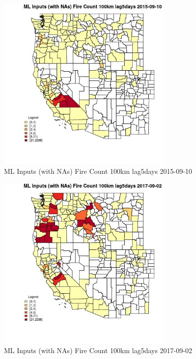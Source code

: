 \begin{figure} 
\centering  
\includegraphics[width=0.77\textwidth]{Code_Outputs/Report_ML_input_PM25_Step4_part_e_de_duplicated_aves_compiled_2019-05-21wNAs_CountyFire_Count_100km_lag5daysMean2015-09-10.jpg} 
\caption{\label{fig:Report_ML_input_PM25_Step4_part_e_de_duplicated_aves_compiled_2019-05-21wNAsCountyFire_Count_100km_lag5daysMean2015-09-10}ML Inputs (with NAs) Fire Count 100km lag5days 2015-09-10} 
\end{figure} 
 

\begin{figure} 
\centering  
\includegraphics[width=0.77\textwidth]{Code_Outputs/Report_ML_input_PM25_Step4_part_e_de_duplicated_aves_compiled_2019-05-21wNAs_CountyFire_Count_100km_lag5daysMean2017-09-02.jpg} 
\caption{\label{fig:Report_ML_input_PM25_Step4_part_e_de_duplicated_aves_compiled_2019-05-21wNAsCountyFire_Count_100km_lag5daysMean2017-09-02}ML Inputs (with NAs) Fire Count 100km lag5days 2017-09-02} 
\end{figure} 
 

